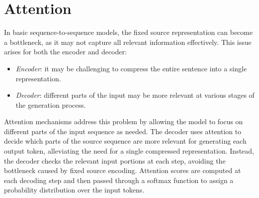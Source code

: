 \section{Attention}

In basic sequence-to-sequence models, the fixed source representation can become a bottleneck, as it may not capture all relevant information effectively. 
This issue arises for both the encoder and decoder:
\begin{itemize}
    \item \textit{Encoder}: it may be challenging to compress the entire sentence into a single representation.
    \item \textit{Decoder}: different parts of the input may be more relevant at various stages of the generation process.
\end{itemize}
Attention mechanisms address this problem by allowing the model to focus on different parts of the input sequence as needed. 
The decoder uses attention to decide which parts of the source sequence are more relevant for generating each output token, alleviating the need for a single compressed representation. 
Instead, the decoder checks the relevant input portions at each step, avoiding the bottleneck caused by fixed source encoding.
Attention scores are computed at each decoding step and then passed through a softmax function to assign a probability distribution over the input tokens.

